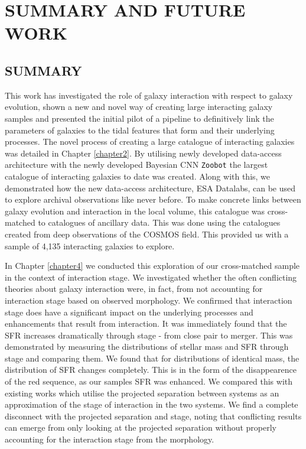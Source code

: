 \chapter{SUMMARY AND FUTURE WORK}\label{chapter:conclusion}
\section{SUMMARY}
\noindent This work has investigated the role of galaxy interaction with respect to galaxy evolution, shown a new and novel way of creating large interacting galaxy samples and presented the initial pilot of a pipeline to definitively link the parameters of galaxies to the tidal features that form and their underlying processes. The novel process of creating a large catalogue of interacting galaxies was detailed in Chapter \ref{chapter2}. By utilising newly developed data-access architecture with the newly developed Bayesian CNN \texttt{Zoobot} the largest catalogue of interacting galaxies to date was created. Along with this, we demonstrated how the new data-access architecture, ESA Datalabs, can be used to explore archival observations like never before. To make concrete links between galaxy evolution and interaction in the local volume, this catalogue was cross-matched to catalogues of ancillary data. This was done using the catalogues created from deep observations of the COSMOS field. This provided us with a sample of 4,135 interacting galaxies to explore.

In Chapter \ref{chapter4} we conducted this exploration of our cross-matched sample in the context of interaction stage. We investigated whether the often conflicting theories about galaxy interaction were, in fact, from not accounting for interaction stage based on observed morphology. We confirmed that interaction stage does have a significant impact on the underlying processes and enhancements that result from interaction. It was immediately found that the SFR increases dramatically through stage - from close pair to merger. This was demonstrated by measuring the distributions of stellar mass and SFR through stage and comparing them. We found that for distributions of identical mass, the distribution of SFR changes completely. This is in the form of the disappearence of the red sequence, as our samples SFR was enhanced. We compared this with existing works which utilise the projected separation between systems as an approximation of the stage of interaction in the two systems. We find a complete disconnect with the projected separation and stage, noting that conflicting results can emerge from only looking at the projected separation without properly accounting for the interaction stage from the morphology. 

